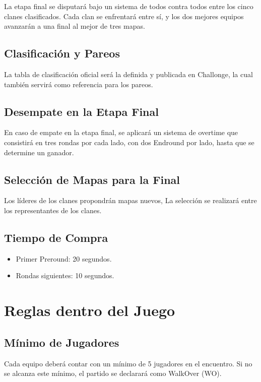 \documentclass[a4paper, 11pt]{article}
\begin{document}
    La etapa final se disputará bajo un sistema de todos contra todos entre los cinco clanes clasificados. Cada clan se enfrentará entre sí, y los dos mejores equipos avanzarán a una final al mejor de tres mapas.

    \subsection{Clasificación y Pareos}
    La tabla de clasificación oficial será la definida y publicada en Challonge, la cual también servirá como referencia para los pareos.

    \subsection{Desempate en la Etapa Final}
    En caso de empate en la etapa final, se aplicará un sistema de overtime que consistirá en tres rondas por cada lado, con dos Endround por lado, hasta que se determine un ganador.

    \subsection{Selección de Mapas para la Final}

    Los líderes de los clanes propondrán mapas nuevos, La selección se realizará entre los representantes de los clanes.

    \subsection{Tiempo de Compra}

    \begin{itemize}
        \item Primer Preround: 20 segundos.
        \item Rondas siguientes: 10 segundos.
    \end{itemize}

    \clearpage

    \section{Reglas dentro del Juego}

    \subsection{Mínimo de Jugadores}
    Cada equipo deberá contar con un mínimo de 5 jugadores en el encuentro. Si no se alcanza este mínimo, el partido se declarará como WalkOver (WO).
\end{document}
